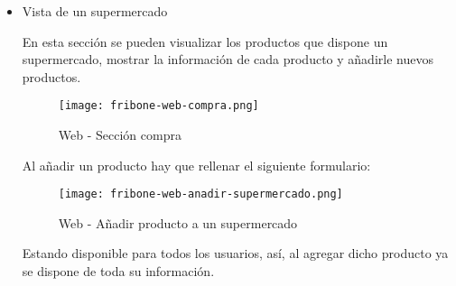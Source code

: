 \begin{itemize}
\begin{itemize}
                \item Vista de un supermercado

                    En esta sección se pueden visualizar los productos que dispone un supermercado, mostrar la información de cada producto y añadirle nuevos productos.

                    \begin{figure}[H]
                        \centering
                        \texttt{[image: fribone-web-compra.png]}
                        \caption{Web - Sección compra}\label{fig:fribone-web-compra}
                    \end{figure}

                    Al añadir un producto hay que rellenar el siguiente formulario:

                    \begin{figure}[H]
                        \centering
                        \texttt{[image: fribone-web-anadir-supermercado.png]}
                        \caption{Web - Añadir producto a un supermercado}\label{fig:fribone-web-anadir-supermercado}
                    \end{figure}

                    Estando disponible para todos los usuarios, así, al agregar dicho producto ya se dispone de toda su información.
            \end{itemize}
    \end{itemize}
